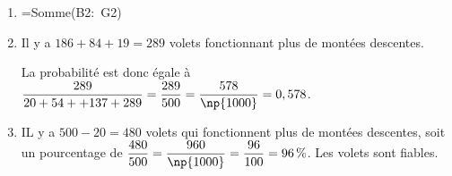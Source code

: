 \begin{enumerate}
\item  %
=Somme(B2:~G2)
\item  %
Il y a $186 + 84 + 19 = 289$ volets fonctionnant plus de  montées descentes.

La probabilité est donc égale à $\dfrac{289}{20 + 54 + + 137 + 289} = \dfrac{289}{500} = \dfrac{578}{\np{1000}} = 0,578$.
\item  %
IL y a $500 - 20 = 480$ volets qui fonctionnent plus de  montées descentes, soit un pourcentage de $\dfrac{480}{500} = \dfrac{960}{\np{1000}} = \dfrac{96}{100} = 96\,\%$. Les volets sont fiables.
\end{enumerate}

\bigskip

